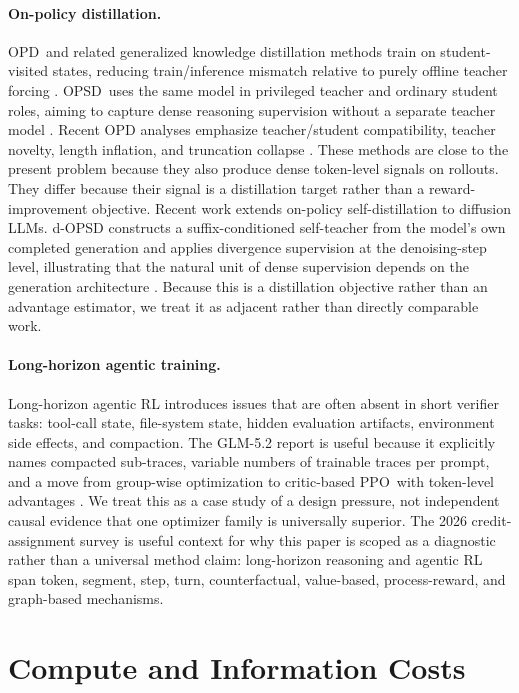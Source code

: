 \documentclass[11pt]{article}
\newcommand{\opd}{\textsc{OPD}}
\newcommand{\opsd}{\textsc{OPSD}}
\newcommand{\ppo}{\textsc{PPO}}
\begin{document}
\paragraph{On-policy distillation.}
\opd\ and related generalized knowledge distillation methods train on
student-visited states, reducing train/inference mismatch relative to purely
offline teacher forcing \citep{agarwal2023gkd,li2026opd}. \opsd\ uses the same
model in privileged teacher and ordinary student roles, aiming to capture dense
reasoning supervision without a separate teacher model \citep{zhao2026opsd}.
Recent OPD analyses emphasize teacher/student compatibility, teacher novelty,
length inflation, and truncation collapse \citep{li2026opd,luo2026opd}. These
methods are close to the present problem because they also produce dense
token-level signals on rollouts. They differ because their signal is a
distillation target rather than a reward-improvement objective.
Recent work extends on-policy self-distillation to diffusion LLMs. d-OPSD
constructs a suffix-conditioned self-teacher from the model's own completed
generation and applies divergence supervision at the denoising-step level,
illustrating that the natural unit of dense supervision depends on the
generation architecture \citep{luo2026dopsd}. Because this is a distillation
objective rather than an advantage estimator, we treat it as adjacent rather
than directly comparable work.

\paragraph{Long-horizon agentic training.}
Long-horizon agentic RL introduces issues that are often absent in short
verifier tasks: tool-call state, file-system state, hidden evaluation
artifacts, environment side effects, and compaction. The GLM-5.2 report is useful because it explicitly names
compacted sub-traces, variable numbers of trainable traces per prompt, and a
move from group-wise optimization to critic-based \ppo\ with token-level
advantages \citep{zai2026glm52}. We treat this as a case study of a design
pressure, not independent causal evidence that one optimizer family is
universally superior.
The 2026 credit-assignment survey \citep{zhang2026creditassignment} is useful
context for why this paper is scoped as a diagnostic rather than a universal
method claim: long-horizon reasoning and agentic RL span token, segment, step,
turn, counterfactual, value-based, process-reward, and graph-based mechanisms.

\section{Compute and Information Costs}
\end{document}
